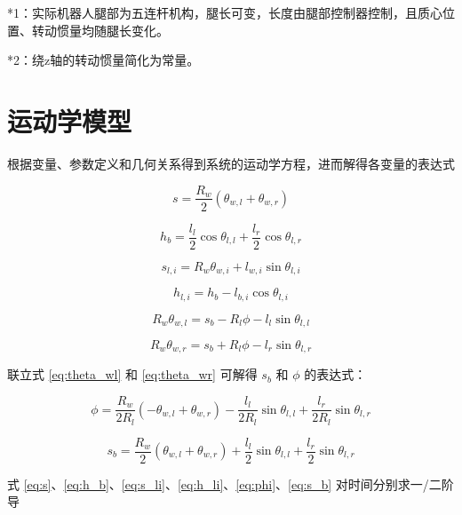 *1：实际机器人腿部为五连杆机构，腿长可变，长度由腿部控制器控制，且质心位置、转动惯量均随腿长变化。

*2：绕z轴的转动惯量简化为常量。

\section{运动学模型}

根据变量、参数定义和几何关系得到系统的运动学方程，进而解得各变量的表达式

\begin{equation}
s = \frac{R_w}{2}(\theta_{w,l} + \theta_{w,r}) 
\label{eq:s}
\end{equation}

\begin{equation}
h_b = \frac{l_l}{2}\cos\theta_{l,l} + \frac{l_r}{2}\cos\theta_{l,r} 
\label{eq:h_b}
\end{equation}

\begin{equation}
s_{l,i} = R_w\theta_{w,i} + l_{w,i}\sin\theta_{l,i}
\label{eq:s_li}
\end{equation}

\begin{equation}
h_{l,i} = h_b - l_{b,i}\cos\theta_{l,i} 
\label{eq:h_li}
\end{equation}

\begin{equation}
R_w\theta_{w,l} = s_b - R_l\phi - l_l\sin\theta_{l,l} 
\label{eq:theta_wl}
\end{equation}

\begin{equation}
R_w\theta_{w,r} = s_b + R_l\phi - l_r\sin\theta_{l,r}
\label{eq:theta_wr}
\end{equation}

联立式 \ref{eq:theta_wl} 和 \ref{eq:theta_wr} 可解得 $s_b$ 和 $\phi$ 的表达式：

\begin{equation}
\phi = \frac{R_w}{2R_l}(-\theta_{w,l} + \theta_{w,r}) - \frac{l_l}{2R_l}\sin\theta_{l,l} + \frac{l_r}{2R_l}\sin\theta_{l,r} 
\label{eq:phi}
\end{equation}

\begin{equation}
s_b = \frac{R_w}{2}(\theta_{w,l} + \theta_{w,r}) + \frac{l_l}{2}\sin\theta_{l,l} + \frac{l_r}{2}\sin\theta_{l,r} 
\label{eq:s_b}
\end{equation}

式 \ref{eq:s}、\ref{eq:h_b}、\ref{eq:s_li}、\ref{eq:h_li}、\ref{eq:phi}、\ref{eq:s_b} 对时间分别求一/二阶导

